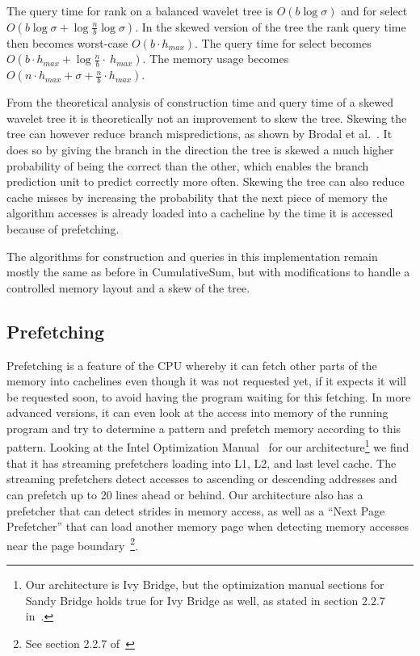 The query time for rank on a balanced wavelet tree is $O(b \log \sigma)$ and for select $O(b \log \sigma + \log \frac{n}{b} \log \sigma)$.
In the skewed version of the tree the rank query time then becomes worst-case $O(b \cdot h_{max})$. The query time for select becomes $O(b \cdot h_{max} + \log \frac{n}{b} \cdot~h_{max})$.
The memory usage becomes $O(n \cdot h_{max} + \sigma + \frac{n}{b} \cdot h_{max})$.


From the theoretical analysis of construction time and query time of a skewed wavelet tree it is theoretically not an improvement to skew the tree.
Skewing the tree can however reduce branch mispredictions, as shown by Brodal et al.~.
It does so by giving the branch in the direction the tree is skewed a much higher probability of being the correct than the other, which enables the branch prediction unit to predict correctly more often. 
Skewing the tree can also reduce cache misses by increasing the probability that the next piece of memory the algorithm accesses is already loaded into a cacheline by the time it is accessed because of prefetching.

The algorithms for construction and queries in this implementation remain mostly the same as before in CumulativeSum, but with modifications to handle a controlled memory layout and a skew of the tree.

\subsection{Prefetching}
Prefetching is a feature of the CPU whereby it can fetch other parts of the memory into cachelines even though it was not requested yet, if it expects it will be requested soon, to avoid having the program waiting for this fetching.
In more advanced versions, it can even look at the access into memory of the running program and try to determine a pattern and prefetch memory according to this pattern.
Looking at the Intel Optimization Manual~ for our architecture\footnote{Our architecture is Ivy Bridge, but the optimization manual sections for Sandy Bridge holds true for Ivy Bridge as well, as stated in section 2.2.7 in~.} we find that it has streaming prefetchers loading into L1, L2, and last level cache. The streaming prefetchers detect accesses to ascending or descending addresses and can prefetch up to 20 lines ahead or behind. 
Our architecture also has a prefetcher that can detect strides in memory access, as well as a “Next Page Prefetcher” that can load another memory page when detecting memory accesses near the page boundary~\footnote{See section 2.2.7 of~}.


